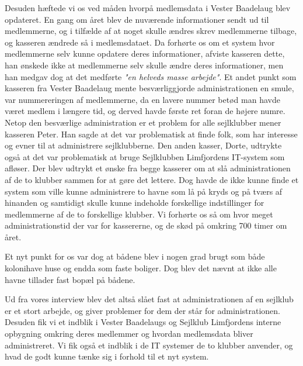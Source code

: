 Desuden hæftede vi os ved måden hvorpå medlemsdata i Vester Baadelaug blev opdateret. En gang om året blev de nuværende informationer sendt ud til medlemmerne, og i tilfælde af at noget skulle ændres skrev medlemmerne tilbage, og kasseren ændrede så i medlemsdataet. Da forhørte os om et system hvor medlemmerne selv kunne opdatere deres informationer, afviste kasseren dette, han ønskede ikke at medlemmerne selv skulle ændre deres informationer, men han medgav dog at det medførte \textit{"en helveds masse arbejde"}. Et andet punkt som kasseren fra Vester Baadelaug mente besværliggjorde administrationen en smule, var nummereringen af medlemmerne, da en lavere nummer betød man havde været medlem i længere tid, og derved havde første ret foran de højere numre. Netop den besværlige administration er et problem for alle sejlklubber mener kasseren Peter. Han sagde at det var problematisk at finde folk, som har interesse og evner til at administrere sejlklubberne. Den anden kasser, Dorte, udtrykte også at det var problematisk at bruge Sejlklubben Limfjordens IT-system som afløser. Der blev udtrykt et ønske fra begge kasserer om at slå administrationen af de to klubber sammen for at gøre det lettere. Dog havde de ikke kunne finde et system som ville kunne administrere to havne som lå på kryds og på tværs af hinanden og samtidigt skulle kunne indeholde forskellige indstillinger for medlemmerne af de to forskellige klubber. Vi forhørte os så om hvor meget administrationstid der var for kassererne, og de skød på omkring 700 timer om året.

Et nyt punkt for os var dog at bådene blev i nogen grad brugt som både kolonihave huse og endda som faste boliger. Dog blev det nævnt at ikke alle havne tillader fast bopæl på bådene. 
 
Ud fra vores interview blev det altså slået fast at administrationen af en sejlklub er et stort arbejde, og giver problemer for dem der står for administrationen. Desuden fik vi et indblik i Vester Baadelaugs og Sejlklub Limfjordens interne opbygning omkring deres medlemmer og hvordan medlemsdata bliver administreret. Vi fik også et indblik i de IT systemer de to klubber anvender, og hvad de godt kunne tænke sig i forhold til et nyt system.
